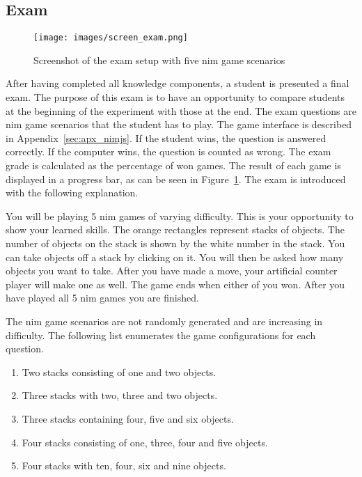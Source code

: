 \subsection{Exam}
\label{sec:setup_exam}
\begin{figure}[ht]
    \centering
    \texttt{[image: images/screen\_exam.png]}
    \caption{Screenshot of the exam setup with five nim game scenarios}
    \label{fig:screen_exam}
\end{figure}
\noindent
After having completed all knowledge components, a student is presented a final
exam. The purpose of this exam is to have an opportunity to compare students at
the beginning of the experiment with those at the end. The exam questions are
nim game scenarios that the student has to play. The game interface is
described in Appendix~\ref{sec:apx_nimjs}. If the student wins, the
question is answered correctly. If the computer wins, the question is counted
as wrong. The exam grade is calculated as the percentage of won games. The result
of each game is displayed in a progress bar, as can be seen in
Figure~\ref{fig:screen_exam}. The exam is introduced with the following explanation.
\begin{framed}\noindent
	You will be playing 5 nim games of varying difficulty. This is your
	opportunity to show your learned skills. The orange rectangles represent
	stacks of objects. The number of objects on the stack is shown by the white
	number in the stack. You can take objects off a stack by clicking on it.
	You will then be asked how many objects you want to take. After you have
	made a move, your artificial counter player will make one as well. The game
	ends when either of you won.
	After you have played all 5 nim games you are finished.
\end{framed}
\noindent The nim game scenarios are not randomly generated and are increasing in
difficulty. The following list enumerates the game configurations for each
question.
\begin{enumerate}
	\item Two stacks consisting of one and two objects.
	\item Three stacks with two, three and two objects.
	\item Three stacks containing four, five and six objects.
	\item Four stacks consisting of one, three, four and five objects.
	\item Four stacks with ten, four, six and nine objects.
\end{enumerate}
